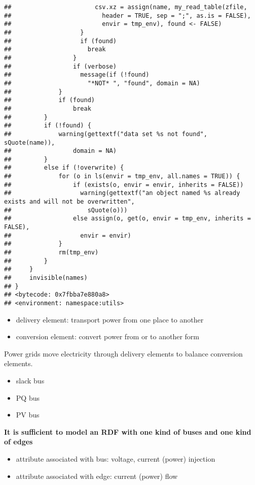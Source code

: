 \documentclass[
]{book}
\providecommand{\tightlist}{%
  \setlength{\itemsep}{0pt}\setlength{\parskip}{0pt}}
\begin{document}
\begin{verbatim}
##                       csv.xz = assign(name, my_read_table(zfile, 
##                         header = TRUE, sep = ";", as.is = FALSE), 
##                         envir = tmp_env), found <- FALSE)
##                   }
##                   if (found) 
##                     break
##                 }
##                 if (verbose) 
##                   message(if (!found) 
##                     "*NOT* ", "found", domain = NA)
##             }
##             if (found) 
##                 break
##         }
##         if (!found) {
##             warning(gettextf("data set %s not found", sQuote(name)), 
##                 domain = NA)
##         }
##         else if (!overwrite) {
##             for (o in ls(envir = tmp_env, all.names = TRUE)) {
##                 if (exists(o, envir = envir, inherits = FALSE)) 
##                   warning(gettextf("an object named %s already exists and will not be overwritten", 
##                     sQuote(o)))
##                 else assign(o, get(o, envir = tmp_env, inherits = FALSE), 
##                   envir = envir)
##             }
##             rm(tmp_env)
##         }
##     }
##     invisible(names)
## }
## <bytecode: 0x7fbba7e880a8>
## <environment: namespace:utils>
\end{verbatim}

\begin{itemize}
\tightlist
\item
  delivery element: transport power from one place to another
\item
  conversion element: convert power from or to another form
\end{itemize}

Power grids move electricity through delivery elements to balance conversion
elements.

\begin{itemize}
\tightlist
\item
  slack bus
\item
  PQ bus
\item
  PV bus
\end{itemize}

\textbf{It is sufficient to model an RDF with one kind of buses and one kind of
edges}

\begin{itemize}
\tightlist
\item
  attribute associated with bus: voltage, current (power) injection
\item
  attribute associated with edge: current (power) flow
\end{itemize}
\end{document}
